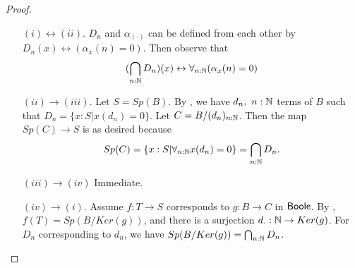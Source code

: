 \begin{proof}
\item 
  \begin{itemize}
  \item[$(i)\leftrightarrow (ii)$.] 
    $D_n$ and $\alpha_{(\cdot)}$ can be defined from each other by 
     $D_n(x) \leftrightarrow (\alpha_x(n) = 0)$. Then observe that
     \begin{equation}
      (\bigcap_{n:\mathbb{N}} D_n) (x) \leftrightarrow 
      \forall_{n:\mathbb N} (\alpha_x(n) = 0) 
     \end{equation}
   \item[$(ii) \to (iii)$.]
      Let $S=Sp(B)$. 
      By , we have $d_n,~n:\mathbb{N}$ terms of $B$ such that $D_n = \{x:S| x(d_n) = 0\}$. 
      Let $C = B/(d_n)_{n:\mathbb{N}}$.
      Then the map $Sp(C) \to S$ is as desired because
      $$Sp(C) = \{x:S| \forall_{n:\mathbb{N}} x(d_n) =0\}  = \bigcap_{n:\mathbb{N}} D_n.$$
   \item[$(iii) \to (iv)$] Immediate.
   \item[$(iv) \to (i)$.] 
     Assume $f:T\to S$ corresponds to $g:B\to C$ in $\mathsf{Boole}$. 
     By , $f(T) = Sp(B/Ker(g))$, and 
     there is a surjection $d_\cdot:\mathbb{N}\to Ker(g)$. 
     For $D_n$ corresponding to $d_n$, we have $Sp(B/Ker(g)) = \bigcap_{n:\mathbb{N}} D_n$. 
%
%

\end{itemize}
\end{proof}
